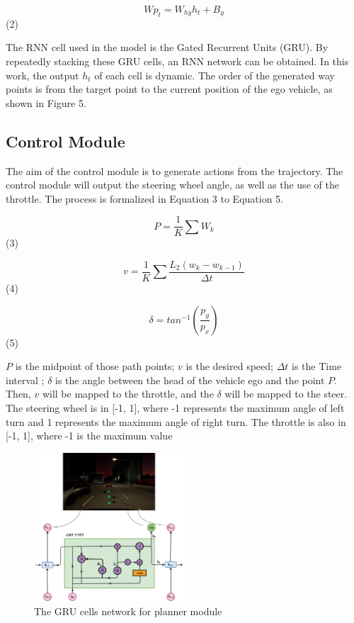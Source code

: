 \documentclass[conference]{IEEEtran}
\begin{document}
\[Wp_{t}=W_{hy}h_{t}+B_{y}\] (2)

The RNN cell used in the model is the Gated Recurrent Units (GRU). By repeatedly stacking these GRU cells, an RNN network can be obtained. In this work, the output \(h_{t}\) of each cell is dynamic. The order of the generated way points is from the target point to the current position of the ego vehicle, as shown in Figure 5.

\subsection{Control Module}

The aim of the control module is to generate actions from the trajectory. The control module will output the steering wheel angle, as well as the use of the throttle. The process is formalized in Equation 3 to Equation 5.

\[P=\frac{1}{K}\sum W_{k}\] (3)

\[v=\frac{1}{K}\sum\frac{L_{2}(w_{k}-w_{k-1})}{\Delta t}\] (4)

\[\delta=tan^{-1}(\frac{p_{y}}{p_{x}})\] (5)

\(P\) is the midpoint of those path points; \(v\) is the desired speed; \(\Delta t\) is the Time interval ; \(\delta\) is the angle between the head of the vehicle ego and the point \(P\). Then, \(v\) will be mapped to the throttle, and the \(\delta\) will be mapped to the steer. The steering wheel is in [-1, 1], where -1 represents the maximum angle of left turn and 1 represents the maximum angle of right turn. The throttle is also in [-1, 1], where -1 is the maximum value

\begin{figure}[htbp]
    \centering
    \includegraphics[width=0.5\textwidth]{5.png}
    \caption{The GRU cells network for planner module}
    \label{fig:5}
\end{figure}
\end{document}
